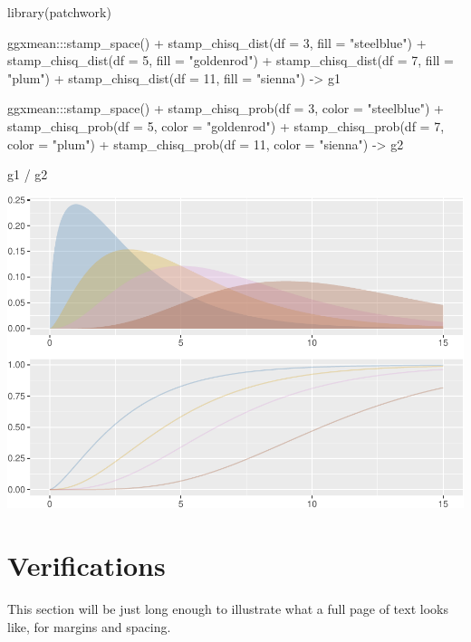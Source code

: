 \documentclass[12pt]{article}
\newenvironment{Shaded}{\begin{snugshade}}{\end{snugshade}}
\newcommand{\AttributeTok}[1]{\textcolor[rgb]{0.77,0.63,0.00}{#1}}
\newcommand{\DecValTok}[1]{\textcolor[rgb]{0.00,0.00,0.81}{#1}}
\newcommand{\FunctionTok}[1]{\textcolor[rgb]{0.00,0.00,0.00}{#1}}
\newcommand{\NormalTok}[1]{#1}
\newcommand{\OtherTok}[1]{\textcolor[rgb]{0.56,0.35,0.01}{#1}}
\newcommand{\SpecialCharTok}[1]{\textcolor[rgb]{0.00,0.00,0.00}{#1}}
\newcommand{\StringTok}[1]{\textcolor[rgb]{0.31,0.60,0.02}{#1}}
\begin{document}
\begin{Shaded}
\begin{Highlighting}[]
\FunctionTok{library}\NormalTok{(patchwork)}

\NormalTok{ggxmean}\SpecialCharTok{:::}\FunctionTok{stamp\_space}\NormalTok{() }\SpecialCharTok{+}
  \FunctionTok{stamp\_chisq\_dist}\NormalTok{(}\AttributeTok{df =} \DecValTok{3}\NormalTok{,  }\AttributeTok{fill =} \StringTok{"steelblue"}\NormalTok{) }\SpecialCharTok{+}
  \FunctionTok{stamp\_chisq\_dist}\NormalTok{(}\AttributeTok{df =} \DecValTok{5}\NormalTok{,  }\AttributeTok{fill =} \StringTok{"goldenrod"}\NormalTok{) }\SpecialCharTok{+}
  \FunctionTok{stamp\_chisq\_dist}\NormalTok{(}\AttributeTok{df =} \DecValTok{7}\NormalTok{,  }\AttributeTok{fill =} \StringTok{"plum"}\NormalTok{) }\SpecialCharTok{+}
  \FunctionTok{stamp\_chisq\_dist}\NormalTok{(}\AttributeTok{df =} \DecValTok{11}\NormalTok{, }\AttributeTok{fill =} \StringTok{"sienna"}\NormalTok{) }\OtherTok{{-}\textgreater{}}
\NormalTok{g1}
  
\NormalTok{ggxmean}\SpecialCharTok{:::}\FunctionTok{stamp\_space}\NormalTok{() }\SpecialCharTok{+}
  \FunctionTok{stamp\_chisq\_prob}\NormalTok{(}\AttributeTok{df =} \DecValTok{3}\NormalTok{,  }\AttributeTok{color =} \StringTok{"steelblue"}\NormalTok{) }\SpecialCharTok{+}
  \FunctionTok{stamp\_chisq\_prob}\NormalTok{(}\AttributeTok{df =} \DecValTok{5}\NormalTok{,  }\AttributeTok{color =} \StringTok{"goldenrod"}\NormalTok{) }\SpecialCharTok{+}
  \FunctionTok{stamp\_chisq\_prob}\NormalTok{(}\AttributeTok{df =} \DecValTok{7}\NormalTok{,  }\AttributeTok{color =} \StringTok{"plum"}\NormalTok{) }\SpecialCharTok{+}
  \FunctionTok{stamp\_chisq\_prob}\NormalTok{(}\AttributeTok{df =} \DecValTok{11}\NormalTok{, }\AttributeTok{color =} \StringTok{"sienna"}\NormalTok{) }\OtherTok{{-}\textgreater{}}
\NormalTok{g2}

\NormalTok{g1 }\SpecialCharTok{/}\NormalTok{ g2}
\end{Highlighting}
\end{Shaded}

\begin{center}\includegraphics[width=0.5\linewidth]{manuscript_files/figure-latex/unnamed-chunk-14-1} \end{center}

\section{Verifications}
\label{sec:verify}

This section will be just long enough to illustrate what a full page of
text looks like, for margins and spacing.

\citep{tishkovskaya2012statistical}



\end{document}
